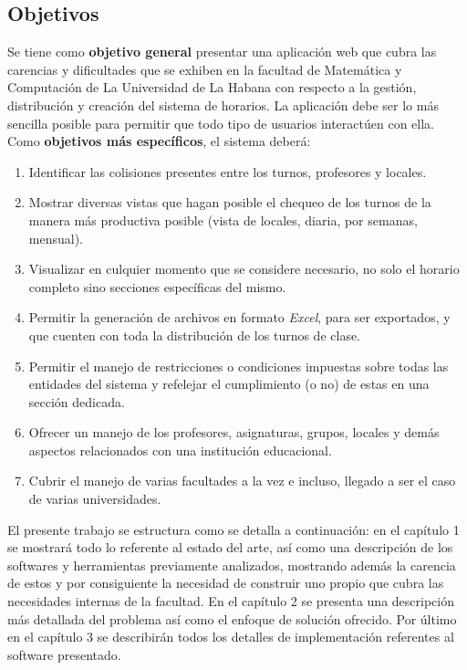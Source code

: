 \begin{introduction}
	\section{Objetivos}
	Se tiene como \textbf{objetivo general} presentar una aplicación web que cubra las carencias y dificultades que se exhiben en la facultad de Matemática y Computación de La Universidad de La Habana con respecto a la gestión, distribución y creación del sistema de horarios. 
	La aplicación debe ser lo más sencilla posible para permitir que todo tipo de usuarios interactúen con ella. Como \textbf{objetivos más específicos}, el sistema deberá:
	\begin{enumerate}
		\item Identificar las colisiones presentes entre los turnos, profesores y locales.
		\item Mostrar diversas vistas que hagan posible el chequeo de los turnos de la manera más productiva posible (vista de locales, diaria, por semanas, mensual).
		\item Visualizar en culquier momento que se considere necesario, no solo el horario completo sino secciones específicas del mismo.
		\item Permitir la generación de archivos en formato \textit{Excel}, para ser exportados, y que cuenten con toda la distribución de los turnos de clase.
		\item Permitir el manejo de restricciones o condiciones impuestas sobre todas las entidades del sistema y refelejar el cumplimiento (o no) de estas en una sección dedicada.
		\item Ofrecer un manejo de los profesores, asignaturas, grupos, locales y demás aspectos relacionados con una institución educacional.
		\item Cubrir el manejo de varias facultades a la vez e incluso, llegado a ser el caso de varias universidades. 
	\end{enumerate}
	
	El presente trabajo se estructura como se detalla a continuación: en el capítulo 1 se mostrará todo lo referente al estado del arte, así como una descripción de los softwares y herramientas previamente analizados, mostrando además la carencia de estos y por consiguiente la necesidad de construir uno propio que cubra las necesidades internas de la facultad. En el capítulo 2 se presenta una descripción más detallada del problema así como el enfoque de solución ofrecido. Por último en el capítulo 3 se describirán todos los detalles de implementación referentes al software presentado.
	

\end{introduction}
